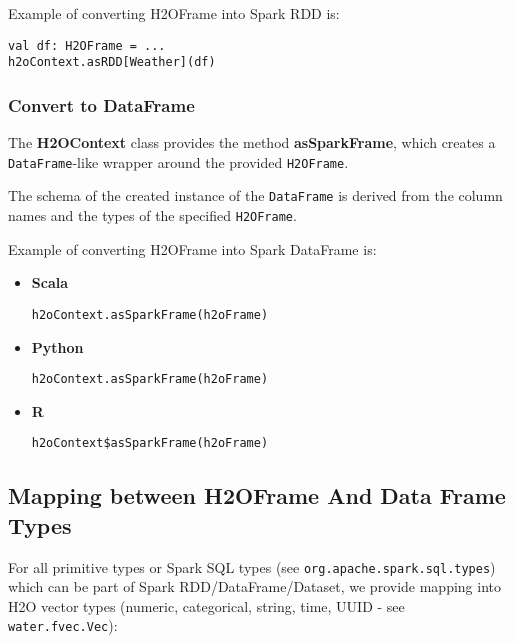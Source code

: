 \documentclass{standalone}
\begin{document}
    Example of converting H2OFrame into Spark RDD is:

    \begin{lstlisting}[style=Scala]
val df: H2OFrame = ...
h2oContext.asRDD[Weather](df)
    \end{lstlisting}

    \subsubsection{Convert to DataFrame}

    The \textbf{H2OContext} class provides the method \textbf{asSparkFrame}, which creates a \texttt{DataFrame}-like
    wrapper around the provided \texttt{H2OFrame}.

    The schema of the created instance of the \texttt{DataFrame} is derived from the column names and the types of
    the specified \texttt{H2OFrame}.

    Example of converting H2OFrame into Spark DataFrame is:
    \begin{itemize}
        \item \textbf{Scala} \begin{lstlisting}[style=Scala]
h2oContext.asSparkFrame(h2oFrame)
        \end{lstlisting}
        \item \textbf{Python} \begin{lstlisting}[style=Python]
h2oContext.asSparkFrame(h2oFrame)
        \end{lstlisting}
        \item \textbf{R} \begin{lstlisting}[style=R]
h2oContext$asSparkFrame(h2oFrame)
        \end{lstlisting}
    \end{itemize}

    \subsection{Mapping between H2OFrame And Data Frame Types}

    For all primitive types or Spark SQL types (see \linebreak \texttt{org.apache.spark.sql.types}) which
    can be part of Spark RDD/DataFrame/Dataset, we provide mapping into H2O vector types (numeric,
    categorical, string, time, UUID - see \texttt{water.fvec.Vec}):
\end{document}
